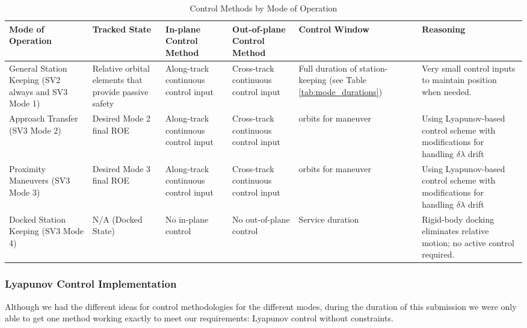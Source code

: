 
\begin{table}[H]
    \centering
    \caption{Control Methods by Mode of Operation}
    \renewcommand{\arraystretch}{1.3}

    \begin{tabularx}{\textwidth}{|>{\raggedright\arraybackslash}p{}|%
                                      >{\raggedright\arraybackslash}p{}|%
                                      >{\raggedright\arraybackslash}p{}|%
                                      >{\raggedright\arraybackslash}p{}|%
                                      >{\raggedright\arraybackslash}p{}|%
                                      >{\raggedright\arraybackslash}X|}
        \rowcolor{lightgray}
        \hline
        \textbf{Mode of Operation} & \textbf{Tracked State} & \textbf{In-plane Control Method} & \textbf{Out-of-plane Control Method} & \textbf{Control Window} & \textbf{Reasoning} \\
        \hline
        General Station Keeping (SV2 always and SV3 Mode 1) & Relative orbital elements that provide passive safety & Along-track continuous control input & Cross-track continuous control input & Full duration of station-keeping (see Table \ref{tab:mode_durations}) & Very small control inputs to maintain position when needed. \\
        \hline
        Approach Transfer (SV3 Mode 2) & Desired Mode 2 final ROE & Along-track continuous control input & Cross-track continuous control input & 15 orbits for maneuver & Using Lyapunov-based control scheme with modifications for handling $\delta \lambda $ drift\\
        \hline
        Proximity Maneuvers (SV3 Mode 3) & Desired Mode 3 final ROE & Along-track continuous control input & Cross-track continuous control input & 15 orbits for maneuver & Using Lyapunov-based control scheme with modifications for handling $\delta \lambda $ drift\\
        \hline
        Docked Station Keeping (SV3 Mode 4) & N/A (Docked State) & No in-plane control & No out-of-plane control & Service duration & Rigid-body docking eliminates relative motion; no active control required. \\
        \hline
    \end{tabularx}
    \label{tab:mode_control_methods_cont}
\end{table}


\subsubsection{Lyapunov Control Implementation}
Although we had the different ideas for control methodologies for the different modes, during the duration of this submission we were only able to get one method working exactly to meet our requirements: Lyapunov control without constraints. 

